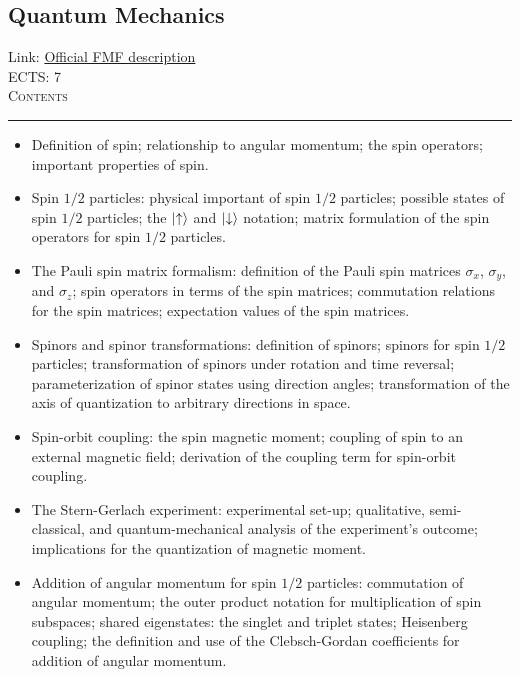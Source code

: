 \documentclass[11pt, a4paper]{article}
\newenvironment{course}[3]{
\subsection{#1}%
Link: \href{#2}{Official FMF description}\\%
ECTS: #3%
\vspace{1ex}
\\
{\large \textsc{Contents}}\\[-0.9ex]%
\rule{\textwidth}{0.5pt}
\vspace{-3ex}
}
{}
\newenvironment{chapter}[1]{
\begin{tcolorbox}[title=#1, breakable]
}
{\end{tcolorbox}}
\begin{document}
\begin{course}{Quantum Mechanics}{https://www.fmf.uni-lj.si/en/study-physics/programmes/1fiz/2020/7000777/courses/1156/}{7}
    \begin{chapter}{Spin}
        \begin{itemize}
        
            \item Definition of spin; relationship to angular momentum; the spin operators; important properties of spin.

            \item Spin $ 1/2 $ particles: physical important of spin $ 1/2 $ particles; possible states of spin $ 1/2 $ particles; the $ \ket{\uparrow} $ and $ \ket{\downarrow} $ notation; matrix formulation of the spin operators for spin $ 1/2 $ particles.

            \item The Pauli spin matrix formalism: definition of the Pauli spin matrices $ \sigma_{x} $, $ \sigma_{y} $, and $ \sigma_{z} $; spin operators in terms of the spin matrices; commutation relations for the spin matrices; expectation values of the spin matrices.

            \item Spinors and spinor transformations: definition of spinors; spinors for spin $ 1/2 $ particles; transformation of spinors under rotation and time reversal; parameterization of spinor states using direction angles; transformation of the axis of quantization to arbitrary directions in space.

            \item Spin-orbit coupling: the spin magnetic moment; coupling of spin to an external magnetic field; derivation of the coupling term for spin-orbit coupling.

            \item The Stern-Gerlach experiment: experimental set-up; qualitative, semi-classical, and quantum-mechanical analysis of the experiment's outcome; implications for the quantization of magnetic moment.

            \item Addition of angular momentum for spin $ 1/2 $ particles: commutation of angular momentum; the outer product notation for multiplication of spin subspaces; shared eigenstates: the singlet and triplet states; Heisenberg coupling; the definition and use of the Clebsch-Gordan coefficients for addition of angular momentum.
        
        \end{itemize}
    \end{chapter}

    \begin{chapter}{Perturbation and approximation theory}
        \begin{itemize}
        

\end{itemize}
\end{chapter}
\end{course}
\end{document}
